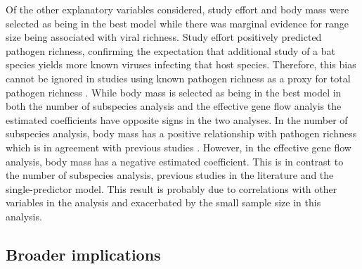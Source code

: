 


Of the other explanatory variables considered, study effort and body mass were selected as being in the best model while there was marginal evidence for range size being associated with viral richness.
Study effort positively predicted pathogen richness, confirming the expectation that additional study of a bat species yields more known viruses infecting that host species.
Therefore, this bias cannot be ignored in studies using known pathogen richness as a proxy for total pathogen richness \cite{nunn2003comparative, gregory1990parasites}.
While body mass is selected as being in the best model in both the number of subspecies analysis and the effective gene flow analyis the estimated coefficients have opposite signs in the two analyses.
In the number of subspecies analysis, body mass has a positive relationship with pathogen richness which is in agreement with previous studies \cite{kamiya2014determines, bordes2008bat, turmelle2009correlates, gay2014parasite, maganga2014bat}.
However, in the effective gene flow analysis, body mass has a negative estimated coefficient.
This is in contrast to the number of subspecies analysis, previous studies in the literature and the single-predictor model.
This result is probably due to correlations with other variables in the analysis and exacerbated by the small sample size in this analysis.







\subsection{Broader implications}

